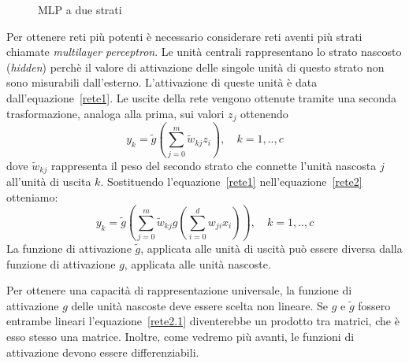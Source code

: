 \documentclass[11pt,a4paper,twoside,
openright]{book}
\begin{document}
\begin{figure}[ht!]
\begin{center}
\caption{MLP a due strati}
\label{fig:MLP2}
\end{center}
\end{figure}
Per ottenere reti più potenti è necessario considerare reti aventi più strati chiamate \textit{multilayer perceptron}. Le unità centrali rappresentano lo strato nascosto (\textit{hidden}) perchè il valore di attivazione delle singole unità di questo strato non sono misurabili dall'esterno. L'attivazione di queste unità è data dall'equazione~\eqref{rete1}. Le uscite della rete vengono ottenute tramite una seconda trasformazione, analoga alla prima, sui valori $z_j$ ottenendo
\begin{equation}
y_k = \tilde{g}\left(\sum\limits_{j=0}^m \tilde{w}_{kj}z_i\right), \quad
k=1,..,c
\label{rete2}
\end{equation}
dove $\tilde{w}_{kj}$ rappresenta il peso del secondo strato che connette l'unità nascosta $j$ all'unità di uscita $k$. Sostituendo l'equazione~\eqref{rete1} nell'equazione~\eqref{rete2} otteniamo:
\begin{equation}
y_k = \tilde{g}\left( \sum\limits_{j=0}^m \tilde{w}_{kj}g\left(\sum\limits_{i=0}^d w_{ji}x_i\right) \right), \quad
k=1,..,c
\label{rete2.1}
\end{equation}
La funzione di attivazione $\tilde{g}$, applicata alle unità di uscità può essere diversa dalla funzione di attivazione $g$, applicata alle unità nascoste.

Per ottenere una capacità di rappresentazione universale, la funzione di attivazione $g$ delle unità nascoste deve essere scelta non lineare. Se $g$ e $\tilde{g}$ fossero entrambe lineari l'equazione~\eqref{rete2.1} diventerebbe un prodotto tra matrici, che è esso stesso una matrice. Inoltre, come vedremo più avanti, le funzioni di attivazione devono essere differenziabili.
\end{document}
